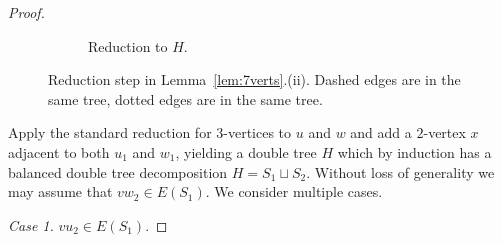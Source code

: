 \documentclass[11pt, reqno, a4paper]{article}
\theoremstyle{definition}
\numberwithin{equation}{section}
\begin{document}
\begin{proof}
\begin{figure}[ht]
\begin{subfigure}{0.4\textwidth}
	\caption{Reduction to $H$.}
	\end{subfigure}
	\caption{Reduction step in Lemma~\ref{lem:7verts}.(ii). Dashed edges are in the same tree, dotted edges are in the same tree.}
\end{figure}
Apply the standard reduction for $3$-vertices to $u$ and $w$ and add a $2$-vertex $x$ adjacent to both $u_1$ and $w_1$, yielding a double tree $H$ which by induction has a balanced double tree decomposition $H = S_1\sqcup S_2$.
Without loss of generality we may assume that $vw_2\in E(S_1)$.
We consider multiple cases.

\textit{Case 1.}
$vu_2\in E(S_1)$.


\end{proof}
\end{document}

